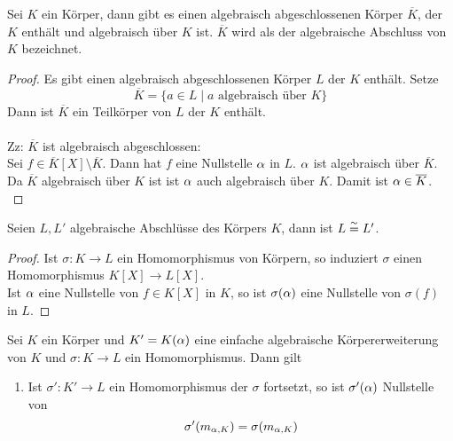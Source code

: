  	\begin{satz}
 		Sei $K$ ein Körper, dann gibt es einen algebraisch abgeschlossenen Körper $\overline{K}$, der $K$ enthält und algebraisch über $K$ ist. $\overline{K}$ wird als der algebraische Abschluss von $K$ bezeichnet.
 	\end{satz}
 	\begin{proof}
 		Es gibt einen algebraisch abgeschlossenen Körper $L$ der $K$ enthält. Setze\[\overline{K}=\{a\in L\mid \text{$a$ algebraisch über $K$}\}\]
 		Dann ist $\overline{K}$ ein Teilkörper von $L$ der $K$ enthält.\\
 		\\
 		Zz: $\overline{K}$ ist algebraisch abgeschlossen:\\
 		Sei $f\in\overline{K}[X]\setminus\overline{K}$. Dann hat $f$ eine Nullstelle $\alpha$ in $L$. $\alpha$ ist algebraisch über $\overline{K}$. Da $\overline{K}$ algebraisch über $K$ ist ist $\alpha$ auch algebraisch über $K$. Damit ist $\alpha\in\overline{K}$.\\
 	\end{proof}
 
 	\begin{kor}
 		Seien $L,L'$ algebraische Abschlüsse des Körpers $K$, dann ist $L\overset{\sim}{=} L'$.
 	\end{kor}
 	\begin{proof}
 		Ist $\sigma:K\to L$ ein Homomorphismus von Körpern, so induziert $\sigma$ einen Homomorphismus $K[X]\to L[X]$.\\
 		Ist $\alpha$ eine Nullstelle von $f\in K[X]$ in $K$, so ist $\sigma(\alpha)$ eine Nullstelle von $\sigma(f)$ in $L$.
 	\end{proof}
 
 	\begin{satz}
 		Sei $K$ ein Körper und $K'=K(\alpha)$ eine einfache algebraische Körpererweiterung von $K$ und $\sigma:K\to L$ ein Homomorphismus. Dann gilt
 		\begin{enumerate}
 			\item Ist $\sigma':K'\to L$ ein Homomorphismus der $\sigma$ fortsetzt, so ist $\sigma'(\alpha)$ Nullstelle von
 			\[\sigma'(m_{\alpha,K})=\sigma(m_{\alpha,K})\]
 		\end{enumerate}
 	\end{satz}
 
